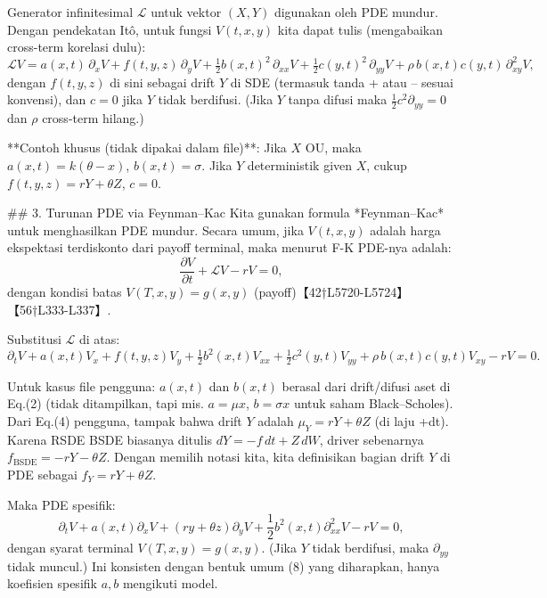 \documentclass{article}
\begin{document}
Generator infinitesimal \(\mathcal{L}\) untuk vektor \((X,Y)\) digunakan oleh PDE mundur. Dengan pendekatan Itô, untuk fungsi \(V(t,x,y)\) kita dapat tulis (mengabaikan cross-term korelasi dulu):  
$$
\mathcal{L}V = a(x,t)\,\partial_x V + f(t,y,z)\,\partial_y V + \tfrac12 b(x,t)^2\,\partial_{xx}V + \tfrac12 c(y,t)^2\,\partial_{yy}V + \rho\,b(x,t)c(y,t)\,\partial^2_{xy}V,
$$  
dengan \(f(t,y,z)\) di sini sebagai drift \(Y\) di SDE (termasuk tanda + atau – sesuai konvensi), dan \(c=0\) jika \(Y\) tidak berdifusi. (Jika \(Y\) tanpa difusi maka \(\frac12c^2 \partial_{yy}=0\) dan \(\rho\) cross-term hilang.)  

**Contoh khusus (tidak dipakai dalam file)**: Jika \(X\) OU, maka \(a(x,t)=k(\theta-x)\), \(b(x,t)=\sigma\). Jika \(Y\) deterministik given \(X\), cukup \(f(t,y,z)=rY+\theta Z\), \(c=0\).  

## 3. Turunan PDE via Feynman–Kac  
Kita gunakan formula *Feynman–Kac* untuk menghasilkan PDE mundur. Secara umum, jika \(V(t,x,y)\) adalah harga ekspektasi terdiskonto dari payoff terminal, maka menurut F-K PDE-nya adalah:  
$$
\frac{\partial V}{\partial t} + \mathcal{L}V - rV = 0,
$$  
dengan kondisi batas \(V(T,x,y) = g(x,y)\) (payoff)【42†L5720-L5724】【56†L333-L337】.   

Substitusi \(\mathcal{L}\) di atas:  
$$
\partial_t V + a(x,t)V_x + f(t,y,z)V_y + \tfrac12 b^2(x,t)V_{xx} + \tfrac12 c^2(y,t)V_{yy} + \rho\,b(x,t)c(y,t)V_{xy} - rV = 0. 
$$

Untuk kasus file pengguna: \(a(x,t)\) dan \(b(x,t)\) berasal dari drift/difusi aset di Eq.(2) (tidak ditampilkan, tapi mis. \(a=\mu x\), \(b=\sigma x\) untuk saham Black–Scholes). Dari Eq.(4) pengguna, tampak bahwa drift \(Y\) adalah \(\mu_Y = rY+\theta Z\) (di laju +dt). Karena RSDE BSDE biasanya ditulis \(dY=-f\,dt+Z\,dW\), driver sebenarnya \(f_{\text{BSDE}} = -rY - \theta Z\). Dengan memilih notasi kita, kita definisikan bagian drift \(Y\) di PDE sebagai \(f_Y = rY+\theta Z\).  

Maka PDE spesifik:  
$$
\partial_tV + a(x,t)\partial_xV + (r y + \theta z)\partial_yV + \frac12 b^2(x,t)\partial^2_{xx}V - rV = 0,
$$  
dengan syarat terminal \(V(T,x,y)=g(x,y)\). (Jika \(Y\) tidak berdifusi, maka \(\partial_{yy}\) tidak muncul.) Ini konsisten dengan bentuk umum (8) yang diharapkan, hanya koefisien spesifik \(a,b\) mengikuti model.  
\end{document}
